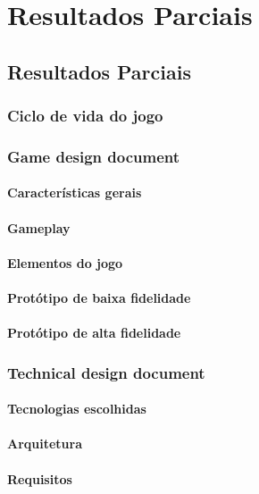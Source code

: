 \part{Resultados Parciais}

\chapter[Resultados Parciais]{Resultados Parciais}

\section{Ciclo de vida do jogo}



\section{Game design document}



\subsection{Características gerais}



\subsection{Gameplay}



\subsection{Elementos do jogo}



\subsection{Protótipo de baixa fidelidade}



\subsection{Protótipo de alta fidelidade}



\section{Technical design document}



\subsection{Tecnologias escolhidas}



\subsection{Arquitetura}



\subsection{Requisitos}

